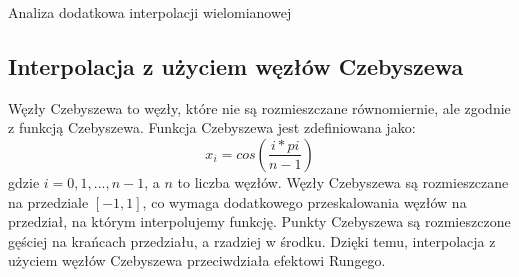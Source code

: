 \documentclass{article}
\begin{document}
\begin{section}{Analiza dodatkowa interpolacji wielomianowej}
  \subsection{Interpolacja z użyciem węzłów Czebyszewa}\cite{wezly_czebyszewa_wiki}
  Węzły Czebyszewa to węzły, które nie są rozmieszczane równomiernie, ale zgodnie z funkcją Czebyszewa. Funkcja Czebyszewa
  jest zdefiniowana jako:
  \begin{equation}
    x_{i} = cos(\frac{i * pi}{n - 1})
  \end{equation}
  gdzie $i = 0, 1, ..., n - 1$, a $n$ to liczba węzłów. Węzły Czebyszewa są rozmieszczane na przedziale $[-1, 1]$, co wymaga
  dodatkowego przeskalowania węzłów na przedział, na którym interpolujemy funkcję.
  Punkty Czebyszewa są rozmieszczone gęściej na krańcach przedziału, a rzadziej w środku. Dzięki temu, interpolacja z użyciem
  węzłów Czebyszewa przeciwdziała efektowi Rungego.


\end{section}
\end{document}
